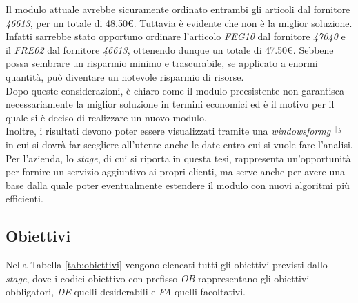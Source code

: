 \noindent Il modulo attuale avrebbe sicuramente ordinato entrambi gli articoli dal fornitore \textit{46613},
per un totale di 48.50€. Tuttavia è evidente che non è la miglior soluzione.
Infatti sarrebbe stato opportuno ordinare l'articolo \textit{FEG10} dal fornitore \textit{47040} e il
\textit{FRE02} dal fornitore \textit{46613}, ottenendo dunque un totale di 47.50€.
Sebbene possa sembrare un risparmio minimo e trascurabile, se applicato a enormi quantità, può
diventare un notevole risparmio di risorse.\\

\noindent Dopo queste considerazioni, è chiaro come il modulo preesistente non garantisca necessariamente la miglior soluzione in termini economici ed è il motivo per il quale
si è deciso di realizzare un nuovo modulo.\\

\noindent Inoltre, i risultati devono poter essere visualizzati tramite una \textit{\gls{windowsformg}} $^{[g]}$ in cui si dovrà far scegliere all'utente
anche le date entro cui si vuole fare l'analisi.\\

\noindent Per l'azienda, lo \textit{stage}, di cui si riporta in questa tesi, rappresenta un'opportunità per fornire un servizio aggiuntivo ai propri clienti, ma serve anche per avere una base
dalla quale poter eventualmente estendere il modulo con nuovi algoritmi più efficienti.
\newpage
\subsection{Obiettivi}
\label{sec:obiettivi}
\noindent Nella Tabella \ref{tab:obiettivi} vengono elencati tutti gli obiettivi previsti dallo \textit{stage}, dove
i codici obiettivo con prefisso \textit{OB} rappresentano gli obiettivi obbligatori, \textit{DE} quelli desiderabili
e \textit{FA} quelli facoltativi.

\renewcommand{\arraystretch}{1.55}


